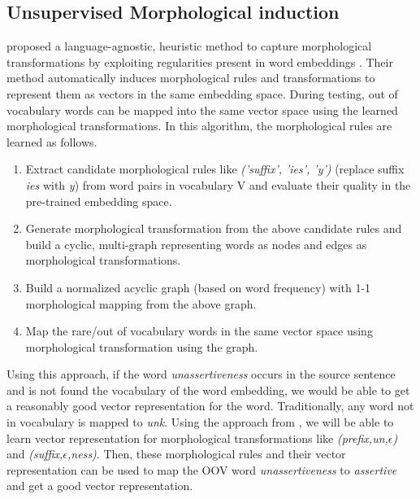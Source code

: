 \subsection{Unsupervised Morphological induction \citep{soricut2015unsupervised}}

\cite{soricut2015unsupervised} proposed a language-agnostic, heuristic method to capture morphological transformations by exploiting regularities present in word embeddings \citep{mikolov2013distributed}. Their method automatically induces morphological rules and transformations to represent them as vectors in the same embedding space. During testing, out of vocabulary words can be mapped into the same vector space using the learned morphological transformations. In this algorithm, the morphological rules are learned as follows.

\begin{enumerate}
	\item Extract candidate morphological rules like \textit{('suffix', 'ies', 'y')} (replace suffix \textit{ies} with \textit{y}) from word pairs in vocabulary V and evaluate their quality in the pre-trained embedding space.
	\item Generate morphological transformation from the above candidate rules and build a cyclic, multi-graph representing words as nodes and edges as morphological transformations.
	\item Build a normalized acyclic graph (based on word frequency) with 1-1 morphological mapping from the above graph.
	\item Map the rare/out of vocabulary words in the same vector space using morphological transformation using the graph.
\end{enumerate}

Using this approach, if the word \textit{unassertiveness} occurs in the source sentence and is not found the vocabulary of the word embedding, we would be able to get a reasonably good vector representation for the word. Traditionally, any word not in vocabulary is mapped to \textit{unk}. Using the approach from  \cite{soricut2015unsupervised}, we will be able to learn vector representation for morphological transformations like \textit{(prefix,un,$\epsilon$)} and \textit{(suffix,$\epsilon$,ness)}. Then, these morphological rules and their vector representation can be used to map the OOV word \textit{unassertiveness} to  \textit{assertive} and get a good vector representation. 

